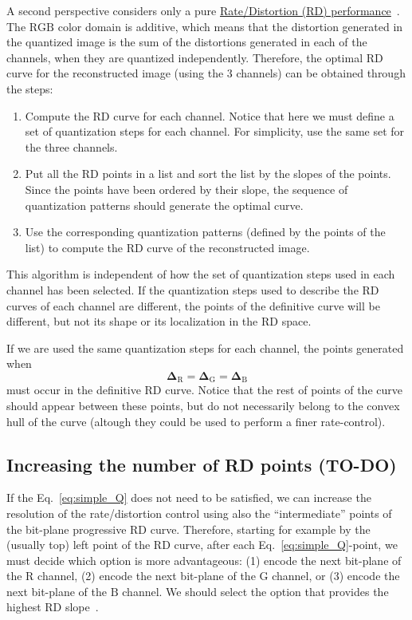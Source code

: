 A second perspective considers only a pure
\href{https://en.wikipedia.org/wiki/Rate-distortion_theory}{Rate/Distortion
  (RD) performance}~\cite{vruiz__information_theory}. The $\text{RGB}$
color domain is additive, which means that the distortion generated in
the quantized image is the sum of the distortions generated in each of
the channels, when they are quantized independently. Therefore, the
optimal RD curve for the reconstructed image (using the $3$ channels)
can be obtained through the steps:
\begin{enumerate}
\item Compute the RD curve for each channel. Notice that here we must
  define a set of quantization steps for each channel. For simplicity,
  use the same set for the three channels.
\item Put all the RD points in a list and sort the list by the slopes
  of the points. Since the points have been ordered by their slope,
  the sequence of quantization patterns should generate the optimal
  curve.
\item Use the corresponding quantization patterns (defined by the points
  of the list) to compute the RD curve of the reconstructed image.
\end{enumerate}

This algorithm is independent of how the set of quantization steps
used in each channel has been selected. If the quantization steps used
to describe the RD curves of each channel are different, the points of
the definitive curve will be different, but not its shape or its
localization in the RD space.

If we are used the same quantization steps for each channel, the
points generated when
\begin{equation}
  \mathbf{\Delta}_{\text{R}} = \mathbf{\Delta}_{\text{G}} = \mathbf{\Delta}_{\text{B}}
\end{equation}
must occur in the definitive RD curve. Notice that the rest of points
of the curve should appear between these points, but do not
necessarily belong to the convex hull of the curve (altough they could
be used to perform a finer rate-control).

\subsection{Increasing the number of RD points (TO-DO)}
\label{sec:increasing}
If the Eq.~\eqref{eq:simple_Q} does not need to be satisfied, we can
increase the resolution of the rate/distortion control using also the
``intermediate'' points of the bit-plane progressive RD
curve. Therefore, starting for example by the (usually top) left point
of the RD curve, after each Eq.~\eqref{eq:simple_Q}-point, we must
decide which option is more advantageous: (1) encode the next
bit-plane of the $\text{R}$ channel, (2) encode the next bit-plane of
the $\text{G}$ channel, or (3) encode the next bit-plane of the
$\text{B}$ channel. We should select the option that provides the
highest RD slope~\cite{vruiz__information_theory}.


